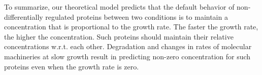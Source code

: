 To summarize, our theoretical model predicts that the default behavior of non-differentially regulated proteins between two conditions is to maintain a concentration that is proportional to the growth rate.
The faster the growth rate, the higher the concentration.
Such proteins should maintain their relative concentrations w.r.t. each other.
Degradation and changes in rates of molecular machineries at slow growth result in predicting non-zero concentration for such proteins even when the growth rate is zero.